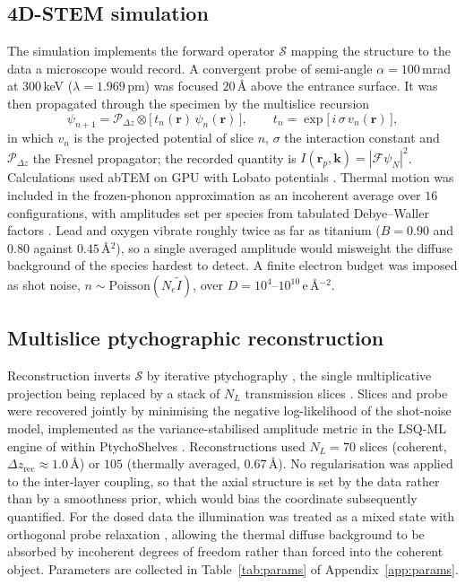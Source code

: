 \documentclass[aps,prb,twocolumn,superscriptaddress,floatfix,nofootinbib]{revtex4-2}
\begin{document}
\subsection{4D-STEM simulation}

The simulation implements the forward operator $\mathcal{S}$ mapping the structure to the data a
microscope would record. A convergent probe of semi-angle $\alpha=100$\,mrad at $300$\,keV
($\lambda=1.969$\,pm) was focused $20$\,\AA{} above the entrance surface. It was then propagated
through the specimen by the multislice recursion \citep{CowleyMoodie1957}
\begin{equation}
  \psi_{n+1} = \mathcal{P}_{\Delta z}\!\otimes\!\big[\,t_n(\mathbf{r})\,\psi_n(\mathbf{r})\,\big],
  \qquad t_n = \exp\!\big[\,i\,\sigma\, v_n(\mathbf{r})\,\big],
  \label{eq:multislice}
\end{equation}
in which $v_n$ is the projected potential of slice $n$, $\sigma$ the interaction constant and
$\mathcal{P}_{\Delta z}$ the Fresnel propagator; the recorded quantity is
$I(\mathbf{r}_p,\mathbf{k})=|\mathcal{F}\psi_N|^2$. Calculations used abTEM
\citep{MadsenSusi2021} on GPU with Lobato potentials \citep{LobatoVanDyck2014}. Thermal motion
was included in the frozen-phonon approximation \citep{LoaneXuSilcox1991} as an incoherent
average over $16$ configurations, with amplitudes set per species from tabulated Debye--Waller
factors \citep{Peng1996}. Lead and oxygen vibrate roughly twice as far as titanium ($B=0.90$
and $0.80$ against $0.45$\,\AA$^2$), so a single averaged amplitude would misweight the diffuse
background of the species hardest to detect. A finite electron budget was imposed as shot noise,
$n \sim \mathrm{Poisson}(N_e\tilde I)$, over $D=10^{4}$--$10^{10}$\,e\,\AA$^{-2}$.

\subsection{Multislice ptychographic reconstruction}

Reconstruction inverts $\mathcal{S}$ by iterative ptychography
\citep{RodenburgFaulkner2004}, the single multiplicative projection being replaced
by a stack of $N_L$ transmission slices \citep{MaidenHumphryRodenburg2012}. Slices and probe
were recovered jointly by minimising the negative log-likelihood of the shot-noise model,
implemented as the variance-stabilised amplitude metric \citep{ThibaultGuizar2012} in the LSQ-ML
engine of \citet{Odstrcil2018} within PtychoShelves \citep{Wakonig2020}. Reconstructions used
$N_L=70$ slices (coherent, $\Delta z_{\mathrm{rec}}\approx1.0$\,\AA) or $105$ (thermally
averaged, $0.67$\,\AA). No regularisation was applied to the inter-layer coupling, so that the
axial structure is set by the data rather than by a smoothness prior, which would bias the
coordinate subsequently quantified. For the dosed data the illumination was treated as a mixed
state \citep{ThibaultMenzel2013} with orthogonal probe relaxation \citep{Odstrcil2016},
allowing the thermal diffuse background to be absorbed by incoherent degrees of freedom rather
than forced into the coherent object. Parameters are collected in Table~\ref{tab:params} of Appendix~\ref{app:params}.
\end{document}

